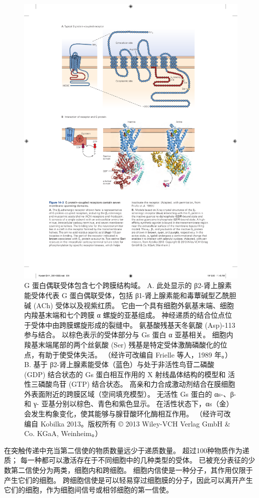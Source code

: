 \begin{figure}[htbp]
	\centering
	\includegraphics[width=0.75\linewidth]{chap14/fig_14_3}
	\caption{G 蛋白偶联受体包含七个跨膜结构域。 A. 此处显示的 β2-肾上腺素能受体代表 G 蛋白偶联受体，包括 β1-肾上腺素能和毒蕈碱型乙酰胆碱 (ACh) 受体以及视紫红质。 它由一个具有细胞外氨基末端、细胞内羧基末端和七个跨膜 α 螺旋的亚基组成。 神经递质的结合位点位于受体中由跨膜螺旋形成的裂缝中。 氨基酸残基天冬氨酸 (Asp)-113 参与结合。 以棕色表示的受体部分与 Gs 蛋白 α 亚基相关。 细胞内羧基末端尾部的两个丝氨酸 (Ser) 残基是特定受体激酶磷酸化的位点，有助于使受体失活。 （经许可改编自 Frielle 等人，1989 年。）B. 基于 β2-肾上腺素能受体（蓝色）与处于非活性鸟苷二磷酸 (GDP) 结合状态的 Gs 蛋白相互作用的 X 射线晶体结构的模型和 活性三磷酸鸟苷 (GTP) 结合状态。 高亲和力合成激动剂结合在膜细胞外表面附近的跨膜区域（空间填充模型）。 无活性 Gs 蛋白的 αs-、β- 和 γ- 亚基分别以棕色、青色和紫色显示。 在活性状态下，αs（金）会发生构象变化，使其能够与腺苷酸环化酶相互作用。 （经许可改编自 Kobilka 2013。版权所有 © 2013 Wiley-VCH Verlag GmbH \& Co. KGaA, Weinheim。）}
	\label{fig:14_3}
\end{figure}


在突触传递中充当第二信使的物质数量远少于递质数量。 超过100种物质作为递质； 每一种都可以激活存在于不同细胞中的几种类型的受体。
已被充分表征的少数第二信使分为两类，细胞内和跨细胞。
细胞内信使是一种分子，其作用仅限于产生它们的细胞。 
跨细胞信使是可以轻易穿过细胞膜的分子，因此可以离开产生它们的细胞，作为细胞间信号或相邻细胞的第一信使。


